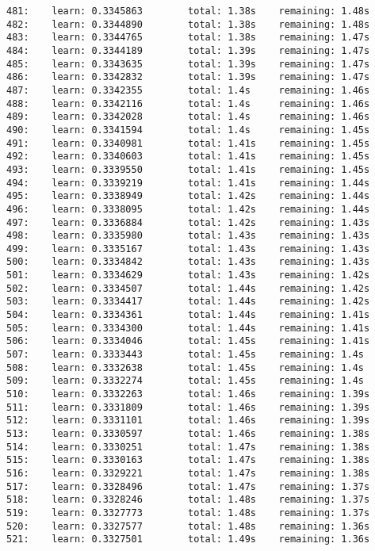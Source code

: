 \documentclass[11pt]{article}
\begin{document}
\begin{Verbatim}[commandchars=\\\{\}]
481:    learn: 0.3345863        total: 1.38s    remaining: 1.48s
482:    learn: 0.3344890        total: 1.38s    remaining: 1.48s
483:    learn: 0.3344765        total: 1.38s    remaining: 1.47s
484:    learn: 0.3344189        total: 1.39s    remaining: 1.47s
485:    learn: 0.3343635        total: 1.39s    remaining: 1.47s
486:    learn: 0.3342832        total: 1.39s    remaining: 1.47s
487:    learn: 0.3342355        total: 1.4s     remaining: 1.46s
488:    learn: 0.3342116        total: 1.4s     remaining: 1.46s
489:    learn: 0.3342028        total: 1.4s     remaining: 1.46s
490:    learn: 0.3341594        total: 1.4s     remaining: 1.45s
491:    learn: 0.3340981        total: 1.41s    remaining: 1.45s
492:    learn: 0.3340603        total: 1.41s    remaining: 1.45s
493:    learn: 0.3339550        total: 1.41s    remaining: 1.45s
494:    learn: 0.3339219        total: 1.41s    remaining: 1.44s
495:    learn: 0.3338949        total: 1.42s    remaining: 1.44s
496:    learn: 0.3338095        total: 1.42s    remaining: 1.44s
497:    learn: 0.3336884        total: 1.42s    remaining: 1.43s
498:    learn: 0.3335980        total: 1.43s    remaining: 1.43s
499:    learn: 0.3335167        total: 1.43s    remaining: 1.43s
500:    learn: 0.3334842        total: 1.43s    remaining: 1.43s
501:    learn: 0.3334629        total: 1.43s    remaining: 1.42s
502:    learn: 0.3334507        total: 1.44s    remaining: 1.42s
503:    learn: 0.3334417        total: 1.44s    remaining: 1.42s
504:    learn: 0.3334361        total: 1.44s    remaining: 1.41s
505:    learn: 0.3334300        total: 1.44s    remaining: 1.41s
506:    learn: 0.3334046        total: 1.45s    remaining: 1.41s
507:    learn: 0.3333443        total: 1.45s    remaining: 1.4s
508:    learn: 0.3332638        total: 1.45s    remaining: 1.4s
509:    learn: 0.3332274        total: 1.45s    remaining: 1.4s
510:    learn: 0.3332263        total: 1.46s    remaining: 1.39s
511:    learn: 0.3331809        total: 1.46s    remaining: 1.39s
512:    learn: 0.3331101        total: 1.46s    remaining: 1.39s
513:    learn: 0.3330597        total: 1.46s    remaining: 1.38s
514:    learn: 0.3330251        total: 1.47s    remaining: 1.38s
515:    learn: 0.3330163        total: 1.47s    remaining: 1.38s
516:    learn: 0.3329221        total: 1.47s    remaining: 1.38s
517:    learn: 0.3328496        total: 1.47s    remaining: 1.37s
518:    learn: 0.3328246        total: 1.48s    remaining: 1.37s
519:    learn: 0.3327773        total: 1.48s    remaining: 1.37s
520:    learn: 0.3327577        total: 1.48s    remaining: 1.36s
521:    learn: 0.3327501        total: 1.49s    remaining: 1.36s

\end{Verbatim}
\end{document}
